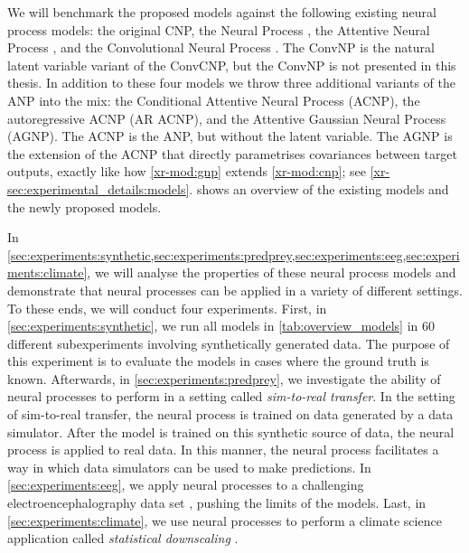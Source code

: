 \documentclass[12pt, twoside]{report}
\newcommand{\xrprefix}[1]{xr-#1}
\begin{document}
We will benchmark the proposed models against the following existing neural process models:
the original CNP, the Neural Process \parencite[NP;][]{Garnelo:2018:Neural_Processes},
the Attentive Neural Process \parencite[ANP;][]{Kim:2019:Attentive_Neural_Processes},
and the Convolutional Neural Process \parencite[ConvNP;][]{Foong:2020:Meta-Learning_Stationary_Stochastic_Process_Prediction}.
The ConvNP is the natural latent variable variant of the ConvCNP, but the ConvNP is not presented in this thesis.
In addition to these four models we throw three additional variants of the ANP into the mix:
the Conditional Attentive Neural Process (ACNP), 
the autoregressive ACNP (AR ACNP),
and the Attentive Gaussian Neural Process (AGNP).
The ACNP is the ANP, but without the latent variable.
The AGNP is the extension of the ACNP that directly parametrises covariances between target outputs, exactly like how \cref{\xrprefix{mod:gnp}} extends \cref{\xrprefix{mod:cnp}};
see \cref{\xrprefix{sec:experimental_details:models}}.
 shows an overview of the existing models and the newly proposed models.

In \cref{sec:experiments:synthetic,sec:experiments:predprey,sec:experiments:eeg,sec:experiments:climate},
we will analyse the properties of these neural process models
and demonstrate that neural processes can be applied in a variety of different settings.
To these ends, we will conduct four experiments.
First, in \cref{sec:experiments:synthetic}, we run all models in \cref{tab:overview_models} in 60 different subexperiments involving synthetically generated data.
The purpose of this experiment is to evaluate the models in cases where the ground truth is known.
Afterwards, in \cref{sec:experiments:predprey}, we investigate the ability of neural processes to perform in a setting called \emph{sim-to-real transfer}.
In the setting of sim-to-real transfer, the neural process is trained on data generated by a data simulator.
After the model is trained on this synthetic source of data, the neural process is applied to real data.
In this manner, the neural process facilitates a way in which data simulators can be used to make predictions.
In \cref{sec:experiments:eeg}, we apply neural processes to a challenging electroencephalography data set \parencite{Zhang:1995:Event_Related_Potentials_During_Object}, pushing the limits of the models.
Last, in \cref{sec:experiments:climate}, we use neural processes to perform a climate science application called \emph{statistical downscaling} \parencite{Maraun:2018:Statistical_Downscaling_and_Bias_Correction}.
\end{document}
